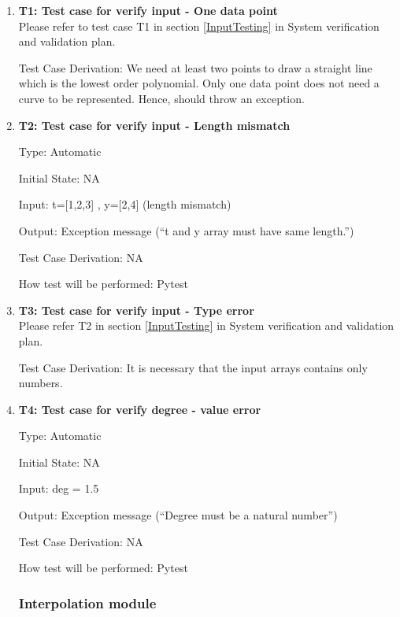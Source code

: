 \documentclass[12pt, titlepage]{article}
\begin{document}
\begin{enumerate}

\item{\textbf{T1: Test case for verify input - One data point}}\\
Please refer to test case T1 in section \ref{InputTesting} in System 
verification and validation plan.
				
Test Case Derivation: We need at least two points to draw a straight line which 
is the lowest order polynomial. Only one data point does not need a curve to be 
represented. Hence, \famname{} should throw an exception.
					
\item{\textbf{T2: Test case for verify input - Length mismatch}}

Type: Automatic
					
Initial State: NA 
					
Input: t=[1,2,3] , y=[2,4] (length mismatch)
					
Output: Exception message (``t and y array must have same length.'')

Test Case Derivation: NA

How test will be performed: Pytest


\item{\textbf{T3: Test case for verify input - Type error}}\\
Please refer T2 in section \ref{InputTesting} in System verification and 
validation plan.
					

Test Case Derivation: It is necessary that the input arrays contains only 
numbers.



\item{\textbf{T4: Test case for verify degree - value error}}

Type: Automatic

Initial State: NA 

Input: deg = 1.5 

Output: Exception message (``Degree must be a natural number'')

Test Case Derivation: NA

How test will be performed: Pytest


    
\subsubsection{Interpolation module}


\end{enumerate}
\end{document}
